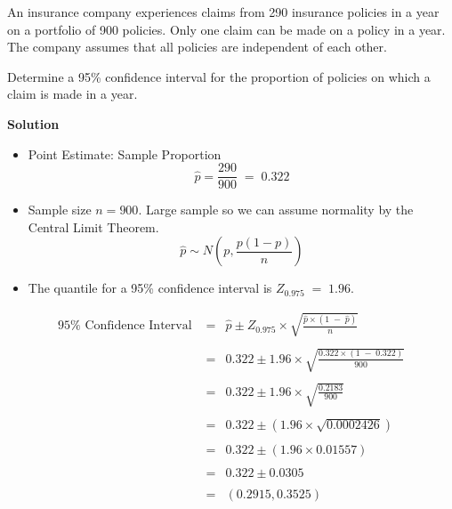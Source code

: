 \documentclass[a4paper,12pt]{article}
\begin{document}
	
	
	\noindent An insurance company experiences claims from 290 insurance policies in a year on a portfolio of 900 policies. Only one claim can be made on a policy in a year. The company assumes that all policies are independent of each other.
	
	
	\noindent Determine a 95\% confidence interval for the proportion of policies on which a claim is made in a year. 
	
	\medskip
	\noindent \textbf{Solution}
	
	
	
	
	\begin{itemize}
		\item Point Estimate: Sample Proportion
		\[\hat{p} = \frac{290}{900} \;=\; 0.322  \]
		\item Sample size $n=900$. Large sample so we can assume normality by the Central Limit Theorem.
		\[ \hat{p} \sim N \left( p, \frac{p(1-p)}{n} \right) \]
		\item The quantile for a 95\% confidence interval is $Z_{0.975} \;=\; 1.96$.
	\end{itemize}
	
	
	\begin{eqnarray*}
		95\% \mbox{ Confidence Interval } &=& \hat{p} \pm Z_{0.975} \times \sqrt{  \frac{\hat{p} \times ( 1 \;-\;  \hat{p}) }{n}  } \\
		& & \\
		&=&  0.322 \pm 1.96 \times  \sqrt{  \frac{0.322 \times ( 1 \;-\;  0.322) }{900}  } \\
		& & \\
		&=&  0.322 \pm 1.96 \times  \sqrt{  \frac{0.2183 }{900}  } \\
		& & \\
		&=& 0.322 \pm (1.96 \times \sqrt{0.0002426} )\\
		& & \\
		&=& 0.322 \pm (1.96 \times 0.01557)\\
		& & \\
		&=& 0.322 \pm 0.0305\\
		& & \\
		&=& ( 0.2915,  0.3525 )\\
	\end{eqnarray*}
	
\end{document}
